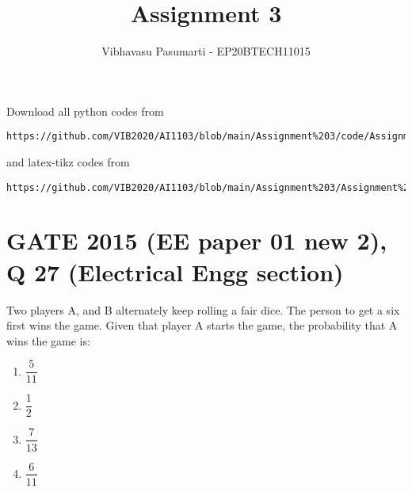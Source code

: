 \documentclass[journal,12pt,twocolumn]{IEEEtran}
\theoremstyle{definition}
\numberwithin{equation}{subsection}
\renewcommand{\thefigure}{\theproblem}
\begin{document}
\title{Assignment 3}
\author{Vibhavasu Pasumarti - EP20BTECH11015}
\maketitle
\newpage
\bigskip
\renewcommand{\thefigure}{\theenumi}
\renewcommand{\thetable}{\theenumi}
Download all python codes from 
\begin{lstlisting}
https://github.com/VIB2020/AI1103/blob/main/Assignment%203/code/Assignment%203.py
\end{lstlisting}
and latex-tikz codes from 
\begin{lstlisting}
https://github.com/VIB2020/AI1103/blob/main/Assignment%203/Assignment%203.pdf
\end{lstlisting}
\section{\large GATE 2015 (EE paper 01 new 2), Q 27 (Electrical Engg section)}
Two players A, and B alternately keep rolling a fair dice. The person to get a six first wins the game. Given that player A starts the game, the probability that A wins the game is:\\[5pt]
\begin{enumerate}[label=(\Alph*)]
    \item $\dfrac{5}{11}$\\
    \item $\dfrac{1}{2}$ \\
    \item $\dfrac{7}{13}$\\
    \item $\dfrac{6}{11}$
\end{enumerate}
\end{document}
